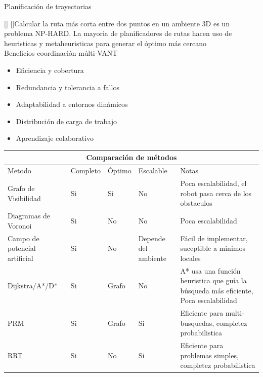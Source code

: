\documentclass[
	11pt, %
	aspectratio=169, %
]{beamer}
\begin{document}
\begin{frame}{Planificación de trayectorias}

  \cite{nphard}[] \cite{5427034}[]Calcular la ruta más corta entre dos puntos en un ambiente 3D es un problema NP-HARD. La mayoria de planificadores de rutas hacen uso de heuristicas y metaheuristicas para generar el óptimo más cercano \\
  \bigskip %
  Beneficios coordinación múlti-VANT
  \begin{itemize}
  \item Eficiencia y cobertura
  \item Redundancia y tolerancia a fallos
  \item Adaptabilidad a entornos dinámicos
  \item Distribución de carga de trabajo
  \item Aprendizaje colaborativo
  \end{itemize}
\end{frame}

\begin{frame}{}
  \centering
  \begin{tabular}{ |p{1.5cm}||p{0.8cm}|p{0.8cm}|p{1.2cm}|p{5cm}|  }
    \hline
    \multicolumn{5}{|c|}{\tiny Comparaci\'{o}n de m\'{e}todos} \\
    \hline 
    \tiny Metodo& \tiny Completo & \tiny \'{O}ptimo& \tiny Escalable& \tiny Notas \\
    \hline
    \tiny Grafo de Visibilidad   & \tiny Si    & \tiny Si&   \tiny No& \tiny Poca escalabilidad, el robot pasa cerca de los obstaculos\\
    \hline
    \tiny Diagramas de Voronoi   & \tiny Si    & \tiny No&   \tiny No& \tiny Poca escalabilidad\\
    \hline
    \tiny Campo de potencial artificial & \tiny Si    & \tiny No&   \tiny Depende del ambiente& \tiny F\'{a}cil de implementar, suceptible a minimos locales\\
    \hline
    \tiny Dijkstra/A*/D* & \tiny Si    & \tiny Grafo&   \tiny No& \tiny A* usa una función heuristica que guía la búsqueda más eficiente, Poca escalabilidad\\
    \hline
    \tiny PRM   & \tiny Si    & \tiny Grafo&   \tiny Si&  \tiny Eficiente para multi-busquedas, completez probabilistica \\
    \hline
    \tiny RRT   & \tiny Si    & \tiny No&   \tiny Si&  \tiny Eficiente para problemas simples, completez probabilistica\\
    \hline
  \end{tabular}  
\end{frame}
\end{document}
